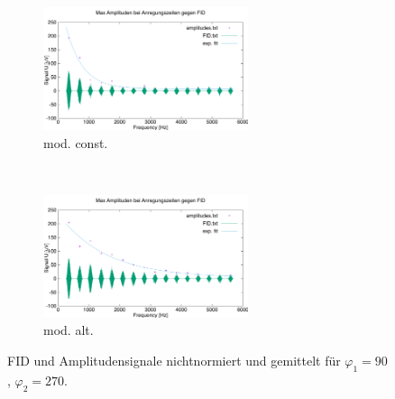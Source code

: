 \documentclass{article}
\begin{document}
        \begin{figure}[H]
            \centering
            \begin{subfigure}[b]{0.4\textwidth}
                \centering
                \includegraphics[width=6cm]{../Bilddateien/CPMG-90-270-constant-avg.png}
                \caption{mod. const.}
                \label{fig:CPMG-90-270-constant-avg}
            \end{subfigure}
            \
            \begin{subfigure}[b]{0.4\textwidth}
                \centering
                \includegraphics[width=6cm]{../Bilddateien/CPMG-90-270-alternating-avg.png}
                \caption{mod. alt.}
                \label{fig:CPMG-90-270-alternating-avg}
            \end{subfigure}
            \caption{FID und Amplitudensignale nichtnormiert und gemittelt für $\varphi_1 = 90$, $\varphi_2 = 270$.}
            \label{fig:CPMG-90-270-avg}
        \end{figure}
        

    
\end{document}
